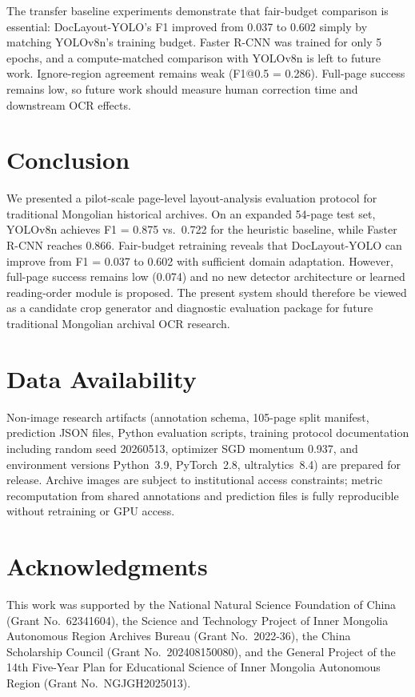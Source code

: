 \documentclass[5p,times,twocolumn]{elsarticle}
\begin{document}
The transfer baseline experiments demonstrate that fair-budget comparison is essential: DocLayout-YOLO's F1 improved from 0.037 to 0.602 simply by matching YOLOv8n's training budget. Faster R-CNN was trained for only 5 epochs, and a compute-matched comparison with YOLOv8n is left to future work. Ignore-region agreement remains weak (F1@0.5 = 0.286). Full-page success remains low, so future work should measure human correction time and downstream OCR effects.

\section{Conclusion}
We presented a pilot-scale page-level layout-analysis evaluation protocol for traditional Mongolian historical archives. On an expanded 54-page test set, YOLOv8n achieves F1 = 0.875 vs.\ 0.722 for the heuristic baseline, while Faster R-CNN reaches 0.866. Fair-budget retraining reveals that DocLayout-YOLO can improve from F1 = 0.037 to 0.602 with sufficient domain adaptation. However, full-page success remains low (0.074) and no new detector architecture or learned reading-order module is proposed. The present system should therefore be viewed as a candidate crop generator and diagnostic evaluation package for future traditional Mongolian archival OCR research.

\section*{Data Availability}
Non-image research artifacts (annotation schema, 105-page split manifest, prediction JSON files, Python evaluation scripts, training protocol documentation including random seed 20260513, optimizer SGD momentum 0.937, and environment versions Python~3.9, PyTorch~2.8, ultralytics~8.4) are prepared for release. Archive images are subject to institutional access constraints; metric recomputation from shared annotations and prediction files is fully reproducible without retraining or GPU access.

\section*{Acknowledgments}
This work was supported by the National Natural Science Foundation of China (Grant No.\ 62341604), the Science and Technology Project of Inner Mongolia Autonomous Region Archives Bureau (Grant No.\ 2022-36), the China Scholarship Council (Grant No.\ 202408150080), and the General Project of the 14th Five-Year Plan for Educational Science of Inner Mongolia Autonomous Region (Grant No.\ NGJGH2025013).
\end{document}
